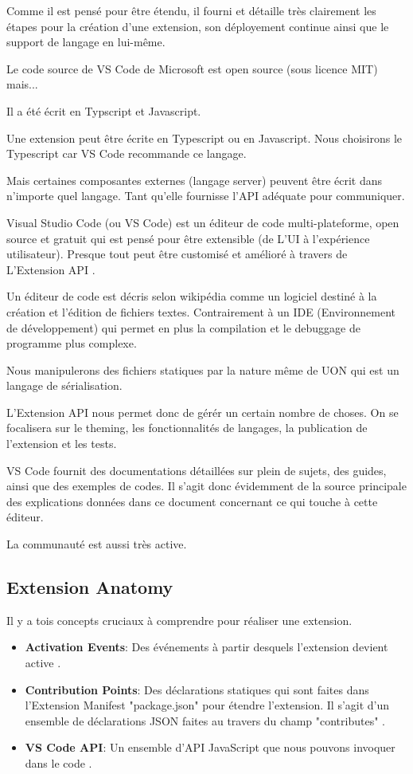 \documentclass[
    iict, %
    il, %
]{heig-tb}
\begin{document}
Comme il est pensé pour être étendu, il fourni et détaille très clairement les étapes pour la création d'une extension, son déployement continue ainsi que le support de langage en lui-même.

Le code source de VS Code de Microsoft est open source (sous licence MIT) mais... %

Il a été écrit en Typscript et Javascript.

Une extension peut être écrite en Typescript ou en Javascript.
Nous choisirons le Typescript car VS Code recommande ce langage.

Mais certaines composantes externes (langage server) peuvent être écrit dans n'importe quel langage. Tant qu'elle fournisse l'API adéquate pour communiquer.

Visual Studio Code (ou VS Code) est un éditeur de code multi-plateforme, open source et gratuit qui est pensé pour être extensible (de L'UI à l'expérience utilisateur).
Presque tout peut être customisé et amélioré à travers de L'Extension API \cite{extension-api}.

Un éditeur de code est décris selon wikipédia comme un logiciel destiné à la création et l'édition de fichiers textes.
Contrairement à un IDE (Environnement de développement) qui permet en plus la compilation et le debuggage de programme plus complexe.

Nous manipulerons des fichiers statiques par la nature même de UON qui est un langage de sérialisation.

L'Extension API nous permet donc de gérér un certain nombre de choses.
On se focalisera sur le theming, les fonctionnalités de langages, la publication de l'extension et les tests.

VS Code fournit des documentations détaillées sur plein de sujets, des guides, ainsi que des exemples de codes.
Il s'agit donc évidemment de la source principale des explications données dans ce document concernant ce qui touche à cette éditeur.

La communauté est aussi très active.

\subsection{Extension Anatomy}
Il y a tois concepts cruciaux à comprendre pour réaliser une extension.

\begin{itemize}
    \item \textbf{Activation Events}: Des événements à partir desquels l'extension devient active \cite{activation-events}.
    \item \textbf{Contribution Points}: Des déclarations statiques qui sont faites dans l'Extension Manifest "package.json" pour étendre l'extension. Il s'agit d'un ensemble de déclarations JSON faites au travers du champ "contributes" \cite{contribution-points}.
    \item \textbf{VS Code API}: Un ensemble d'API JavaScript que nous pouvons invoquer dans le code \cite{vs-code-api}.
\end{itemize}
\end{document}
